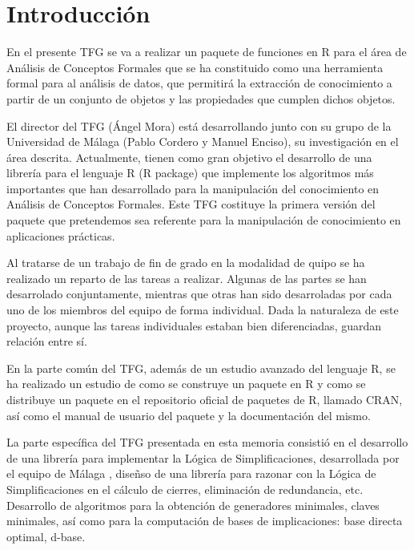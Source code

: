 \section{Introducci\'on}

En el presente TFG se va a realizar un paquete de funciones en R para el \'area de An\'alisis de Conceptos Formales que se ha constituido como una herramienta formal para al an\'alisis de datos, que permitir\'a la extracci\'on de conocimiento a partir de un conjunto de objetos y las propiedades que cumplen dichos objetos.

El director del TFG (\'Angel Mora) est\'a desarrollando junto con su grupo de la Universidad de M\'alaga (Pablo Cordero y Manuel Enciso), su investigaci\'on en el \'area descrita. Actualmente, tienen como gran objetivo el desarrollo de una librer\'ia para el lenguaje R (R package) que implemente los algoritmos m\'as importantes que han desarrollado para la manipulaci\'on del conocimiento en  An\'alisis de Conceptos Formales. Este TFG costituye la primera versi\'on del paquete que pretendemos sea referente para la manipulaci\'on de conocimiento en aplicaciones pr\'acticas.

Al tratarse de un trabajo de fin de grado en la modalidad de quipo se ha realizado un reparto de las tareas a realizar. Algunas de las partes se han desarrolado conjuntamente, mientras que otras han sido desarroladas por cada uno de los miembros del equipo de forma individual. Dada la naturaleza de este proyecto, aunque las tareas individuales estaban bien diferenciadas, guardan relaci\'on entre s\'i.

En la parte com\'un del TFG, adem\'as de un estudio avanzado del lenguaje R, se ha realizado un estudio de como se construye un paquete en R y como se distribuye un paquete en el repositorio oficial de paquetes de R, llamado CRAN, as\'i como el manual de usuario del paquete y la documentaci\'on del mismo.

La parte espec\'ifica del TFG presentada en esta memoria consisti\'o en el desarrollo de una librer\'ia para implementar la L\'ogica de Simplificaciones, desarrollada por el equipo de M\'alaga \cite{Cordero2002}, dise\~nso de una librer\'ia para razonar con la L\'ogica de Simplificaciones en el c\'alculo de cierres, eliminaci\'on de redundancia, etc. Desarrollo de algoritmos para la obtenci\'on de generadores minimales, claves minimales, as\'i como para la computaci\'on de bases de implicaciones: base directa optimal, d-base.\\ 

